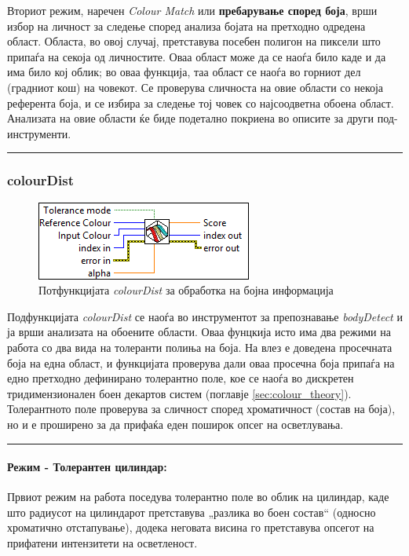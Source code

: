\documentclass[12pt]{article}
\begin{document}
      Вториот режим, наречен \textit{Colour Match} или \textbf{пребарување според боја}, врши избор на личност за следење според анализа бојата на претходно одредена област. Областа, во овој случај, претставува посебен полигон на пиксели што припаѓа на секоја од личностите. Оваа област може да се наоѓа било каде и да има било кој облик; во оваа функција, таа област се наоѓа во горниот дел (градниот кош) на човекот. Се проверува сличноста на овие области со некоја референта боја, и се избира за следење тој човек со најсоодветна обоена област. Анализата на овие области ќе биде подетално покриена во описите за други под-инструменти.
      \textcolor[RGB]{150,150,150}{\rule{\linewidth}{1.6pt}}

    \subsubsection{colourDist}
	    \begin{figure}[H]
	      \includegraphics[width=0.55\linewidth]{./images/colourDist_border.png}
		    \caption{Потфункцијата \textit{colourDist} за обработка на бојна информација}
	      \label{fig:colourDist.png}
	      \raggedright
	      \end{figure}
      Подфункцијата \textit{colourDist} се наоѓа во инструментот за препознавање \textit{bodyDetect} и ја врши анализата на обоените области. Оваа фунцкија исто има два режими на работа со два вида на толеранти полиња на боја. На влез е доведена просечната боја на една област, и функцијата проверува дали оваа просечна боја припаѓа на едно претходно дефинирано толерантно поле, кое се наоѓа во дискретен тридимензионален боен декартов систем (поглавје \ref{sec:colour_theory}). Толерантното поле проверува за сличност според хроматичност (состав на боја), но и е проширено за да прифаќа еден поширок опсег на осветлувања.
      \textcolor[RGB]{150,150,150}{\rule{\linewidth}{1.6pt}}

      \paragraph{Режим - Толерантен цилиндар:\\}
        Првиот режим на работа поседува толерантно поле во облик на цилиндар, каде што радиусот на цилиндарот претставува „разлика во боен состав“ (односно хроматично отстапување), додека неговата висина го претставува опсегот на прифатени интензитети на осветленост.
\end{document}
